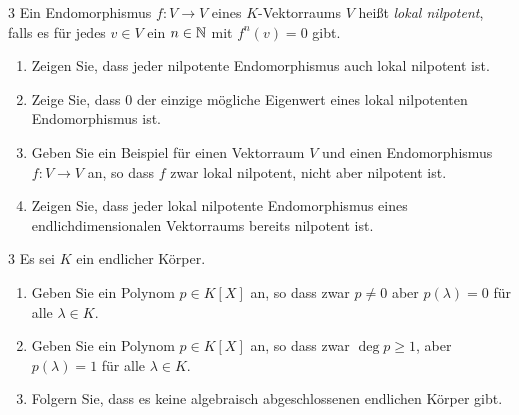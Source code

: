 \begin{question}[subtitle = Unterscheidung zwischen nilpotenten und lokal nilpotenten Endomorphismen]{3}
  Ein Endomorphismus $f \colon V \to V$ eines $K$-Vektorraums $V$ heißt \emph{lokal nilpotent}, falls es für jedes $v \in V$ ein $n \in \mathbb{N}$ mit $f^n(v) = 0$ gibt.
  \begin{enumerate}[leftmargin=*]
    \item
      Zeigen Sie, dass jeder nilpotente Endomorphismus auch lokal nilpotent ist.
    \item
      Zeige Sie, dass $0$ der einzige mögliche Eigenwert eines lokal nilpotenten Endomorphismus ist.
    \item
      Geben Sie ein Beispiel für einen Vektorraum $V$ und einen Endomorphismus $f \colon V \to V$ an, so dass $f$ zwar lokal nilpotent, nicht aber nilpotent ist.
    \item
      Zeigen Sie, dass jeder lokal nilpotente Endomorphismus eines endlichdimensionalen Vektorraums bereits nilpotent ist.
  \end{enumerate}
\end{question}


\begin{question}[subtitle = Zur Unterscheidung von Polynomen und Polynomfunktionen]{3}
  Es sei $K$ ein endlicher Körper.
  \begin{enumerate}[leftmargin=*]
    \item
      Geben Sie ein Polynom $p \in K[X]$ an, so dass zwar $p \neq 0$ aber $p(\lambda) = 0$ für alle $\lambda \in K$.
    \item
      Geben Sie ein Polynom $p \in K[X]$ an, so dass zwar $\deg p \geq 1$, aber $p(\lambda) = 1$ für alle $\lambda \in K$.
    \item
      Folgern Sie, dass es keine algebraisch abgeschlossenen endlichen Körper gibt.
  \end{enumerate}
\end{question}


